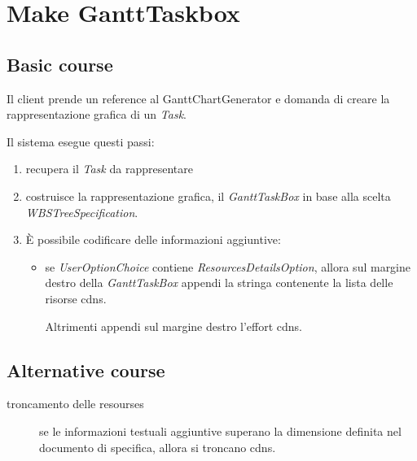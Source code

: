 \section{Make GanttTaskbox}
\label{seq:makeGanttTaskbox}
\subsection{Basic course}
Il client prende un reference al GanttChartGenerator e domanda di creare la
rappresentazione grafica di un \emph{Task}. 

Il sistema esegue questi passi:
\begin{enumerate}
  \item recupera il \emph{Task} da rappresentare
  \item costruisce la rappresentazione grafica, il \emph{GanttTaskBox}
    in base alla scelta \emph{WBSTreeSpecification}.
  \item \`E possibile codificare delle informazioni aggiuntive:
    \begin{itemize}
   	  \item se \emph{UserOptionChoice} contiene \emph{ResourcesDetailsOption},
    	allora sul margine destro della \emph{GanttTaskBox} appendi la stringa
    	contenente la lista delle risorse cdns.
    	
    	Altrimenti appendi sul margine destro l'effort cdns.
    \end{itemize}
    
\end{enumerate}

\subsection{Alternative course}
\begin{description}
\item[troncamento delle resourses] se le informazioni testuali aggiuntive
superano la dimensione definita nel documento di specifica, allora si troncano
cdns.

\end{description}